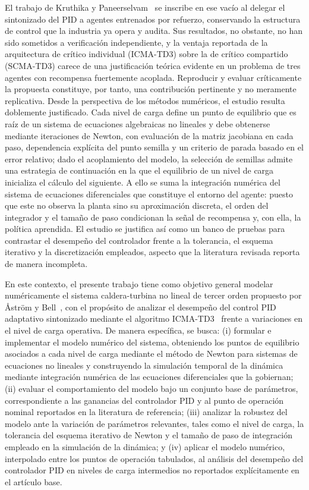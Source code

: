 \documentclass[final,5p,times,twocolumn,authoryear,11pt]{elsarticle}
\begin{document}
El trabajo de Kruthika y Paneerselvam~\citep{kruthika2025novel} se inscribe en ese vacío al delegar el sintonizado del PID a agentes entrenados por refuerzo, conservando la estructura de control que la industria ya opera y audita. Sus resultados, no obstante, no han sido sometidos a verificación independiente, y la ventaja reportada de la arquitectura de crítico individual (ICMA-TD3) sobre la de crítico compartido (SCMA-TD3) carece de una justificación teórica evidente en un problema de tres agentes con recompensa fuertemente acoplada. Reproducir y evaluar críticamente la propuesta constituye, por tanto, una contribución pertinente y no meramente replicativa. Desde la perspectiva de los métodos numéricos, el estudio resulta doblemente justificado. Cada nivel de carga define un punto de equilibrio que es raíz de un sistema de ecuaciones algebraicas no lineales y debe obtenerse mediante iteraciones de Newton, con evaluación de la matriz jacobiana en cada paso, dependencia explícita del punto semilla y un criterio de parada basado en el error relativo; dado el acoplamiento del modelo, la selección de semillas admite una estrategia de continuación en la que el equilibrio de un nivel de carga inicializa el cálculo del siguiente. A ello se suma la integración numérica del sistema de ecuaciones diferenciales que constituye el entorno del agente: puesto que este no observa la planta sino su aproximación discreta, el orden del integrador y el tamaño de paso condicionan la señal de recompensa y, con ella, la política aprendida. El estudio se justifica así como un banco de pruebas para contrastar el desempeño del controlador frente a la tolerancia, el esquema iterativo y la discretización empleados, aspecto que la literatura revisada reporta de manera incompleta.

En este contexto, el presente trabajo tiene como objetivo general modelar numéricamente el sistema caldera-turbina no lineal de tercer orden propuesto por Åström y Bell~\citep{astrom2000drum}, con el propósito de analizar el desempeño del control PID adaptativo sintonizado mediante el algoritmo ICMA-TD3~\citep{kruthika2025novel} frente a variaciones en el nivel de carga operativa. De manera específica, se busca: (i) formular e implementar el modelo numérico del sistema, obteniendo los puntos de equilibrio asociados a cada nivel de carga mediante el método de Newton para sistemas de ecuaciones no lineales y construyendo la simulación temporal de la dinámica mediante integración numérica de las ecuaciones diferenciales que la gobiernan; (ii) evaluar el comportamiento del modelo bajo un conjunto base de parámetros, correspondiente a las ganancias del controlador PID y al punto de operación nominal reportados en la literatura de referencia; (iii) analizar la robustez del modelo ante la variación de parámetros relevantes, tales como el nivel de carga, la tolerancia del esquema iterativo de Newton y el tamaño de paso de integración empleado en la simulación de la dinámica; y (iv) aplicar el modelo numérico, interpolado entre los puntos de operación tabulados, al análisis del desempeño del controlador PID en niveles de carga intermedios no reportados explícitamente en el artículo base.
\end{document}
